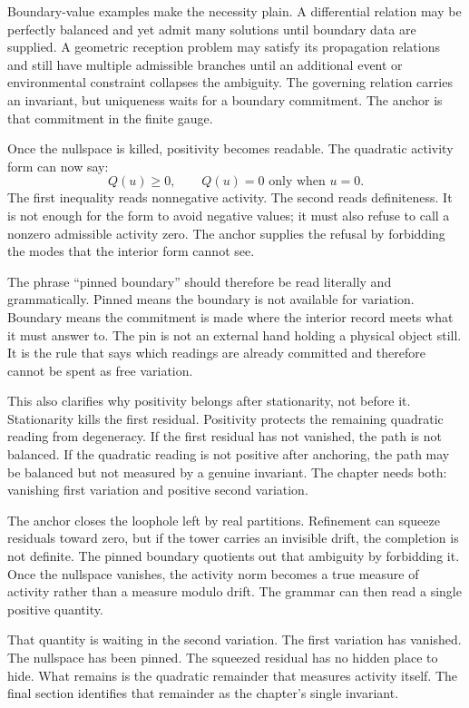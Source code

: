 Boundary-value examples make the necessity plain. A differential relation
may be perfectly balanced and yet admit many solutions until boundary data
are supplied. A geometric reception problem may satisfy its propagation
relations and still have multiple admissible branches until an additional
event or environmental constraint collapses the ambiguity. The governing
relation carries an invariant, but uniqueness waits for a boundary
commitment. The anchor is that commitment in the finite gauge.

Once the nullspace is killed, positivity becomes readable. The quadratic
activity form can now say:
\[
  Q(u) \geq 0,
  \qquad Q(u)=0 \text{ only when } u=0 .
\]
The first inequality reads nonnegative activity. The second reads
definiteness. It is not enough for the form to avoid negative values; it
must also refuse to call a nonzero admissible activity zero. The anchor
supplies the refusal by forbidding the modes that the interior form cannot
see.

The phrase ``pinned boundary'' should therefore be read literally and
grammatically. Pinned means the boundary is not available for variation.
Boundary means the commitment is made where the interior record meets what
it must answer to. The pin is not an external hand holding a physical object
still. It is the rule that says which readings are already committed and
therefore cannot be spent as free variation.

This also clarifies why positivity belongs after stationarity, not before
it. Stationarity kills the first residual. Positivity protects the remaining
quadratic reading from degeneracy. If the first residual has not vanished,
the path is not balanced. If the quadratic reading is not positive after
anchoring, the path may be balanced but not measured by a genuine invariant.
The chapter needs both: vanishing first variation and positive second
variation.

The anchor closes the loophole left by real partitions. Refinement can
squeeze residuals toward zero, but if the tower carries an invisible drift,
the completion is not definite. The pinned boundary quotients out that
ambiguity by forbidding it. Once the nullspace vanishes, the activity norm
becomes a true measure of activity rather than a measure modulo drift. The
grammar can then read a single positive quantity.

That quantity is waiting in the second variation. The first variation has
vanished. The nullspace has been pinned. The squeezed residual has no hidden
place to hide. What remains is the quadratic remainder that measures
activity itself. The final section identifies that remainder as the chapter's
single invariant.
